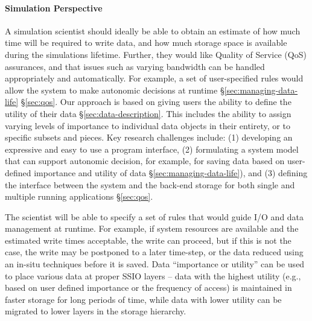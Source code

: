 \paragraph{Simulation Perspective}
\label{subsec:sim-perspective}
A simulation scientist should ideally be able to
obtain an estimate of how much time will be required to write data,
and how much storage space is available during the simulations lifetime.
Further, they would like Quality of Service (QoS) assurances, and that
issues such as varying bandwidth can be handled appropriately and 
automatically. For example, a set of user-specified rules would allow 
the system to make autonomic decisions at runtime
\S\ref{sec:managing-data-life} \S\ref{sec:qos}.
%
Our approach is based on giving users the ability to define the utility of
their data \S\ref{sec:data-description}. This includes the ability to assign
varying levels of importance to individual data objects in their entirety,
or to specific subsets and pieces. Key research challenges include: (1)
developing an expressive and easy to use a program interface, (2) formulating
a system model that can support autonomic decision, for example, for saving
data based on user-defined importance and utility of
data \S\ref{sec:managing-data-life}), and (3) defining the interface between
the system and the back-end storage for both single and multiple running
applications \S\ref{sec:qos}.

The scientist will be able to specify a set of rules that
would guide I/O and data management at runtime. For example, if system
resources are available and the estimated write times acceptable, the write
can proceed, but if this is not the case, the write may be postponed to a
later time-step, or the data reduced using an in-situ techniques before it
is saved. Data ``importance or utility'' can be used to place various data
at proper SSIO layers -- data with the highest utility (e.g., based on user
defined importance or the frequency of access) is maintained in faster
storage for long periods of time, while data with lower utility can be
migrated to lower layers in the storage hierarchy.

%

